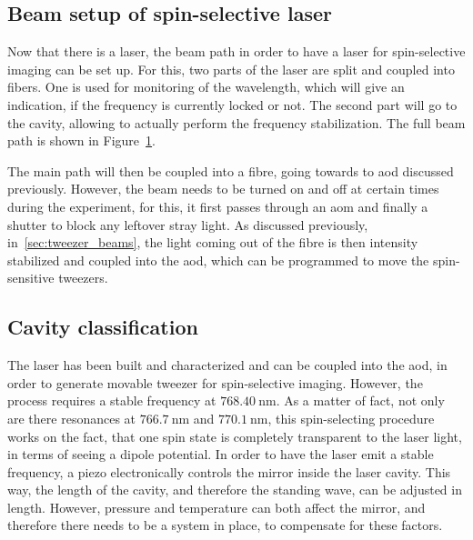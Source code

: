 \subsection{Beam setup of spin-selective laser}

Now that there is a laser, the beam path in order to have a laser for spin-selective imaging can be set up. For this, two parts of the laser are split and coupled into fibers. One is used for monitoring of the wavelength, which will give an indication, if the frequency is currently locked or not. The second part will go to the cavity, allowing to actually perform the frequency stabilization. The full beam path is shown in Figure~\ref{fig:spin_beam_path}.

\begin{figure}[t]%
\label{fig:spin_beam_path}
\end{figure}

The main path will then be coupled into a fibre, going towards to \ac{aod} discussed previously. However, the beam needs to be turned on and off at certain times during the experiment, for this, it first passes through an \ac{aom} and finally a shutter to block any leftover stray light. As discussed previously, in~\ref{sec:tweezer_beams}, the light coming out of the fibre is then intensity stabilized and coupled into the \ac{aod}, which can be programmed to move the spin-sensitive tweezers.

\subsection{Cavity classification}

The laser has been built and characterized and can be coupled into the \ac{aod}, in order to generate movable tweezer for spin-selective imaging. However, the process requires a stable frequency at $\SI{768.40}{\nano\meter}$. As a matter of fact, not only are there resonances at $\SI{766.7}{\nano\meter}$ and $\SI{770.1}{\nano\meter}$, this spin-selecting procedure works on the fact, that one spin state is completely transparent to the laser light, in terms of seeing a dipole potential. In order to have the laser emit a stable frequency, a piezo electronically controls the mirror inside the laser cavity. This way, the length of the cavity, and therefore the standing wave, can be adjusted in length. However, pressure and temperature can both affect the mirror, and therefore there needs to be a system in place, to compensate for these factors.

